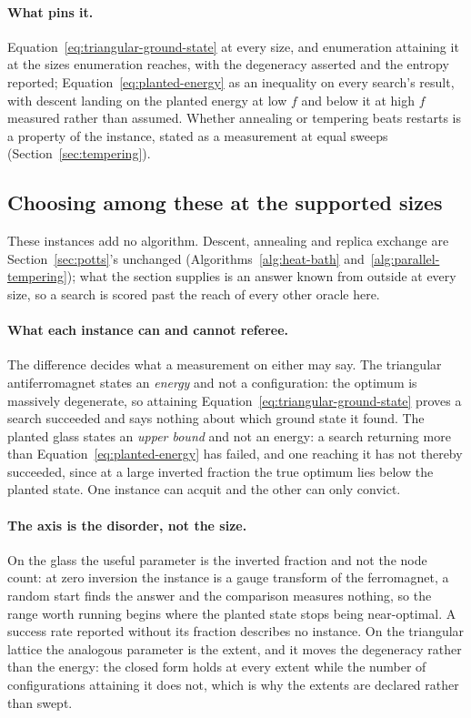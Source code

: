 \documentclass[11pt,a4paper]{article}
\begin{document}
\paragraph{What pins it.}
Equation~\ref{eq:triangular-ground-state} at every size, and enumeration
attaining it at the sizes enumeration reaches, with the degeneracy asserted
and the entropy reported; Equation~\ref{eq:planted-energy} as an inequality
on every search's result, with descent landing on the planted energy at low
$f$ and below it at high $f$ measured rather than assumed. Whether annealing
or tempering beats restarts is a property of the instance, stated as a
measurement at equal sweeps (Section~\ref{sec:tempering}).

\subsection{Choosing among these at the supported sizes}
\label{sec:frustrated:discussion}
These instances add no algorithm. Descent, annealing and replica exchange are
Section~\ref{sec:potts}'s unchanged (Algorithms~\ref{alg:heat-bath}
and~\ref{alg:parallel-tempering}); what the section supplies is an answer known
from outside at every size, so a search is scored past the reach of every other
oracle here.

\paragraph{What each instance can and cannot referee.}
The difference decides what a measurement on either may say. The triangular
antiferromagnet states an \emph{energy} and not a configuration: the optimum is
massively degenerate, so attaining
Equation~\ref{eq:triangular-ground-state} proves a search succeeded and says
nothing about which ground state it found. The planted glass states an
\emph{upper bound} and not an energy: a search returning more than
Equation~\ref{eq:planted-energy} has failed, and one reaching it has not
thereby succeeded, since at a large inverted fraction the true optimum lies
below the planted state. One instance can acquit and the other can only
convict.

\paragraph{The axis is the disorder, not the size.}
On the glass the useful parameter is the inverted fraction and not the node
count: at zero inversion the instance is a gauge transform of the ferromagnet,
a random start finds the answer and the comparison measures nothing, so the
range worth running begins where the planted state stops being near-optimal. A
success rate reported without its fraction describes no instance. On the
triangular lattice the analogous parameter is the extent, and it moves the
degeneracy rather than the energy: the closed form holds at every extent while
the number of configurations attaining it does not, which is why the extents
are declared rather than swept.
\end{document}
